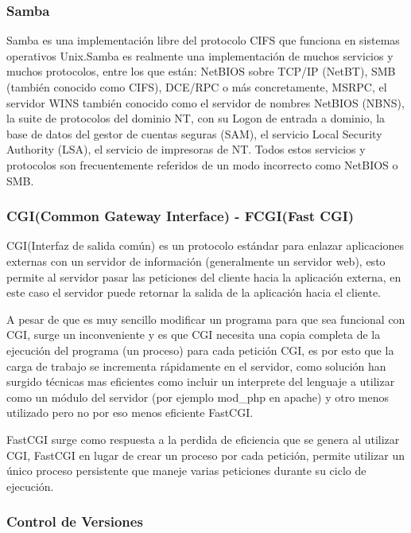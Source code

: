 \subsubsection*{Samba \cite{samba} }

Samba es una implementación libre del protocolo CIFS que funciona en sistemas operativos Unix.\newline Samba es realmente una implementación de muchos servicios y muchos protocolos, entre los que están: NetBIOS sobre TCP/IP (NetBT), SMB (también conocido como CIFS), DCE/RPC o más concretamente, MSRPC, el servidor WINS también conocido como el servidor de nombres NetBIOS (NBNS), la suite de protocolos del dominio NT, con su Logon de entrada a dominio, la base de datos del gestor de cuentas seguras (SAM), el servicio Local Security Authority (LSA), el servicio de impresoras de NT. Todos estos servicios y protocolos son frecuentemente referidos de un modo incorrecto como NetBIOS o SMB.


\subsubsection*{CGI(Common Gateway Interface) - FCGI(Fast CGI)}

CGI(Interfaz de salida común) es un protocolo estándar para enlazar aplicaciones externas con un servidor de información (generalmente un servidor web), esto permite al servidor pasar las peticiones del cliente hacia la aplicación externa, en este caso el servidor puede retornar la salida de la aplicación hacia el cliente.

A pesar de que es muy sencillo modificar un programa para que sea funcional con CGI, surge un inconveniente y es que CGI necesita una copia completa de la ejecución del programa (un proceso) para cada petición CGI, es por esto que la carga de trabajo se incrementa rápidamente en el servidor, como solución han surgido técnicas mas eficientes como incluir un interprete del lenguaje a utilizar como un módulo del servidor (por ejemplo mod\_php en apache) y otro menos utilizado pero no por eso menos eficiente FastCGI.

FastCGI surge como respuesta a la perdida de eficiencia que se genera al utilizar CGI, FastCGI en lugar de crear un proceso por cada petición, permite utilizar un único proceso persistente que maneje varias peticiones durante su ciclo de ejecución.


\subsubsection*{Control de Versiones}

